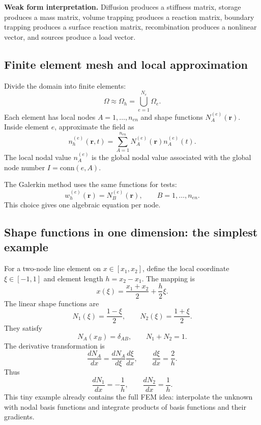 \documentclass[11pt]{article}
\newcommand{\br}{{\bm{r}}}
\begin{document}
\begin{notebox}
\textbf{Weak form interpretation.} Diffusion produces a stiffness matrix, storage produces a mass matrix, volume trapping produces a reaction matrix, boundary trapping produces a surface reaction matrix, recombination produces a nonlinear vector, and sources produce a load vector.
\end{notebox}

\subsection{Finite element mesh and local approximation}
Divide the domain into finite elements:
\begin{equation}
\Omega\approx\Omega_h=\bigcup_{e=1}^{N_e}\Omega_e.
\end{equation}
Each element has local nodes $A=1,\ldots,n_{en}$ and shape functions $N_A^{(e)}(\br)$. Inside element $e$, approximate the field as
\begin{equation}
 n_h^{(e)}(\br,t)=\sum_{A=1}^{n_{en}}N_A^{(e)}(\br)n_A^{(e)}(t).
\label{eq:fem_local_qp_expansion}
\end{equation}
The local nodal value $n_A^{(e)}$ is the global nodal value associated with the global node number $I=\mathrm{conn}(e,A)$.

The Galerkin method uses the same functions for tests:
\begin{equation}
 w_h^{(e)}(\br)=N_B^{(e)}(\br),\qquad B=1,\ldots,n_{en}.
\end{equation}
This choice gives one algebraic equation per node.

\subsection{Shape functions in one dimension: the simplest example}
For a two-node line element on $x\in[x_1,x_2]$, define the local coordinate $\xi\in[-1,1]$ and element length $h=x_2-x_1$. The mapping is
\begin{equation}
 x(\xi)=\frac{x_1+x_2}{2}+\frac{h}{2}\xi.
\end{equation}
The linear shape functions are
\begin{equation}
N_1(\xi)=\frac{1-\xi}{2},\qquad N_2(\xi)=\frac{1+\xi}{2}.
\end{equation}
They satisfy
\begin{equation}
N_A(x_B)=\delta_{AB},\qquad N_1+N_2=1.
\end{equation}
The derivative transformation is
\begin{equation}
\frac{dN_A}{dx}=\frac{dN_A}{d\xi}\frac{d\xi}{dx},
\qquad
\frac{d\xi}{dx}=\frac{2}{h}.
\end{equation}
Thus
\begin{equation}
\frac{dN_1}{dx}=-\frac{1}{h},\qquad \frac{dN_2}{dx}=\frac{1}{h}.
\end{equation}
This tiny example already contains the full FEM idea: interpolate the unknown with nodal basis functions and integrate products of basis functions and their gradients.
\end{document}
